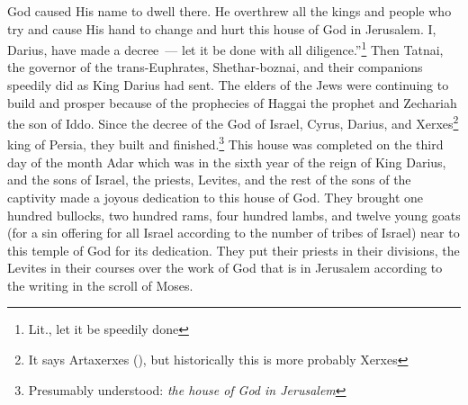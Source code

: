 \begin{enumerate*}[mode=unboxed]
     God caused His name to dwell there. He overthrew all the kings and people who try and cause His hand to change and hurt this house of God in Jerusalem. I, Darius, have made a decree~--- let it be done with all diligence.''\footnote{Lit., let it be speedily done}%
     Then Tatnai, the governor of the trans-Euphrates, Shethar-boznai, and their companions speedily did as King Darius had sent.%
     The elders of the Jews were continuing to build and prosper because of the prophecies of Haggai the prophet and Zechariah the son of Iddo. Since the decree of the God of Israel, Cyrus, Darius, and Xerxes\footnote{It says Artaxerxes (), but historically this is more probably Xerxes} king of Persia, they built and finished.\footnote{Presumably understood: \textit{the house of God in Jerusalem}}%
     This house was completed on the third day of the month Adar which was in the sixth year of the reign of King Darius,%
     and the sons of Israel, the priests, Levites, and the rest of the sons of the captivity made a joyous dedication to this house of God.%
     They brought one hundred bullocks, two hundred rams, four hundred lambs, and twelve young goats (for a sin offering for all Israel according to the number of tribes of Israel) near to this temple of God for its dedication.%
     They put their priests in their divisions, the Levites in their courses over the work of God that is in Jerusalem according to the writing in the scroll of Moses.%
\end{enumerate*}
